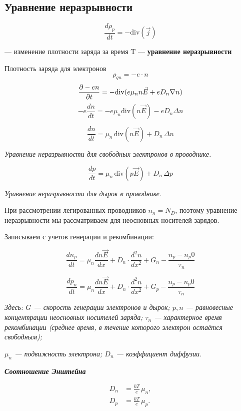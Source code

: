 \documentclass[../main.tex]{subfiles}
\begin{document}
\subsection{Уравнение неразрывности}
\[\frac{d \rho_p}{d t} = - \mathrm{div}( \vec j)\]
\begin{center}
    --- изменение плотности заряда за время T --- \textbf{уравнение неразрывности}
\end{center}

Плотность заряда для электронов
\[\rho_{qn} = - e \cdot n\]
\[\frac{\partial -en}{\partial t} = -\mathrm{div}(e \mu_n n \vec E + e D_n \nabla n)\]
\[-e \frac{d n}{d t} = -e \mu_n \mathrm{div}(n \vec E) - eD_n \Delta n\]

\[
\boxed{
\frac{d n}{d t} = \mu_n \, \mathrm{div}(n \vec{E}) + D_n \, \Delta n
}
\]
\begin{center}
\textit{Уравнение неразрывности для свободных электронов в проводнике.}
\end{center}

\[
\boxed{
\frac{d p}{d t} = \mu_n \, \mathrm{div}(p \vec{E}) + D_n \, \Delta p
}
\]
\begin{center}
\textit{Уравнение неразрывности для дырок в проводнике.}
\end{center}



При рассмотрении легированных проводников $n_n = N_D$, поэтому уравнение неразрывности мы рассматриваем для неосновных носителей зарядов.

Записываем с учетов генерации и рекомбинации:

\[\frac{d n_p}{d t} = \mu_n \frac{d n \vec E}{dx} + D_n \cdot \frac{d^2 n}{dx^2}+ G_n - \frac{n_p - n_p0}{\tau_n}\]

\[\frac{d p_n}{d t} = \mu_n \frac{d n \vec E}{dx} + D_n \cdot \frac{d^2 n}{dx^2}+ G_p - \frac{n_p - n_p0}{\tau_n}\]

\begin{center}
    \textit{Здесь: $G$ — скорость генерации электронов и дырок; $p, n$ — равновесные концентрации неосновных носителей заряда; 
    $\tau_n$ — характерное время рекомбинации (среднее время, в течение которого электрон остаётся свободным);}
    
    \textit{$\mu_n$ — подвижность электрона; $D_n$ — коэффициент диффузии.}
    \end{center}

\textbf{\textit{Соотношение Энштейна}}

\[
\boxed{
\begin{aligned}
D_n &= \frac{kT}{e} \, \mu_n, \\[6pt]
D_p &= \frac{kT}{e} \, \mu_p.
\end{aligned}
}
\]
\end{document}
